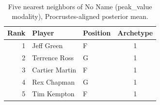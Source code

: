 \begin{table}[htbp]
  \centering\small
  \begin{tabular}{rllc}
    \toprule
    Rank & Player & Position & Archetype \\
    \midrule
    1 & Jeff Green & F & 1 \\
    2 & Terrence Ross & G & 1 \\
    3 & Cartier Martin & F & 1 \\
    4 & Rex Chapman & G & 1 \\
    5 & Tim Kempton & F & 1 \\
    \bottomrule
  \end{tabular}
  \caption{Five nearest neighbors of No Name (peak_value modality), Procrustes-aligned posterior mean.}
  \label{tab:No_Name_neighbors_peak_value}
\end{table}


